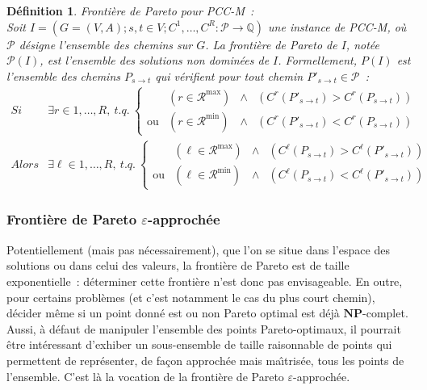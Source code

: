 \documentclass[10pt,francais]{llncs}
\newtheorem{defs}{D\'efinition}
\begin{document}
{\begin{defs}\label{def-pareto}
Fronti\`ere de Pareto pour \textsc{PCC-M}~:\\
Soit $I=\left(G=(V,A) ; s,t\in V ; C^1,\ldots,C^R: \mathcal{P}\rightarrow\mathbb{Q}\right)$ une instance de \textsc{PCC-M}, o\`u $\mathcal{P}$ d\'esigne l'ensemble des chemins sur $G$. La fronti\`ere de Pareto de $I$, not\'ee $\mathscr{P}(I)$, est l'ensemble des solutions non domin\'ees de $I$. Formellement, $P(I)$ est l'ensemble des chemins $P_{s \to t}$ qui v\'erifient pour tout chemin ${P'}_{s \to t}\in \mathcal{P}$~:
$$\begin{array}{ll}
		Si &\exists r\in 1,\ldots,R,\ t.q.\ 
			\left\{\begin{array}{llcl}
									&\left(r\in \mathscr{R}^{\max}\right) 	&\wedge	&\left(C^r(P'_{s \to t}) > C^r(P_{s \to t})\right)\\
					\textrm{ou}		&\left(r\in \mathscr{R}^{\min}\right)	&\wedge &\left(C^r(P'_{s \to t}) < C^r(P_{s \to t})\right)
			\end{array}\right.\\[20pt]
		Alors  							&\exists \ell\in 1,\ldots,R,\ t.q.\ 
			\left\{\begin{array}{llcl}
									&\left(\ell\in \mathscr{R}^{\max}\right) 	&\wedge	&\left(C^\ell(P_{s \to t}) > C^\ell(P'_{s \to t})\right)\\
						\textrm{ou}	&\left(\ell\in \mathscr{R}^{\min}\right)		&\wedge &\left(C^\ell(P_{s \to t}) < C^\ell(P'_{s \to t})\right)
						\end{array}\right.
\end{array}$$
\end{defs}

\subsubsection{Fronti\`ere de Pareto $\varepsilon$-approch\'ee}\label{subsub-approx-multiobj-epsilon}
Potentiellement (mais pas n\'ecessairement), que l'on se situe dans l'espace des solutions ou dans celui des valeurs, la fronti\`ere de Pareto est de taille exponentielle~: d\'eterminer cette fronti\`ere n'est donc pas envisageable. En outre, pour certains probl\`emes (et c'est notamment le cas du plus court chemin), d\'ecider m\^eme si un point donn\'e est ou non Pareto optimal est d\'ej\`a $\mathbf{NP}$-complet. Aussi, \`a d\'efaut de manipuler l'ensemble des points Pareto-optimaux, il pourrait \^etre int\'eressant d'exhiber un sous-ensemble de taille raisonnable de points qui permettent de repr\'esenter, de fa\c{c}on approch\'ee mais ma\^{\i}tris\'ee, tous les points de l'ensemble. C'est l\`a la vocation de la fronti\`ere de Pareto $\varepsilon$-approch\'ee.  

}
\end{document}
